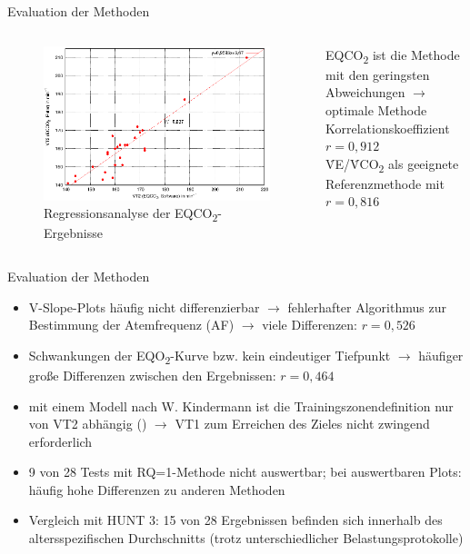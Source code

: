 \documentclass[colorBG,slideColor,8pt]{beamer}
\newcommand{\eqotwo}{EQO\textsubscript{2}}
\newcommand{\eqcotwo}{EQCO\textsubscript{2}}
\newcommand{\vcotwo}{\.{V}CO\textsubscript{2}}
\newcommand{\ve}{\.{V}E}
\begin{document}
\begin{frame}{Evaluation der Methoden}
\begin{columns}
\begin{column}{0.5\linewidth}
\begin{figure}[H]
	\centering
	\includegraphics[width=\linewidth]{Bilder/korr_eqco2.eps}
	\caption{Regressionsanalyse der \eqcotwo-Ergebnisse}
\end{figure}
\end{column}
\begin{column}{0.5\linewidth}
	\eqcotwo{} ist die Methode mit den geringsten Abweichungen $\rightarrow$ optimale Methode\\
	\vspace{3ex}
	Korrelationskoeffizient $r = 0,912$\\
	\vspace{3ex}
	\ve/\vcotwo{} als geeignete Referenzmethode mit $r = 0,816$
\end{column}
\end{columns}
\end{frame}

\begin{frame}{Evaluation der Methoden}
\begin{itemize}
	\item V-Slope-Plots häufig nicht differenzierbar $\rightarrow$ fehlerhafter Algorithmus zur Bestimmung der Atemfrequenz (AF) $\rightarrow$ viele Differenzen: $r = 0,526$
	\item Schwankungen der \eqotwo-Kurve bzw. kein eindeutiger Tiefpunkt $\rightarrow$ häufiger große Differenzen zwischen den Ergebnissen: $r = 0,464$
	\item mit einem Modell nach W. Kindermann ist die Trainingszonendefinition nur von VT2 abhängig (\cite{Kindermann.2004}) $\rightarrow$ VT1 zum Erreichen des Zieles nicht zwingend erforderlich
	\item 9 von 28 Tests mit RQ=1-Methode nicht auswertbar; bei auswertbaren Plots: häufig hohe Differenzen zu anderen Methoden
	\item Vergleich mit HUNT 3: 15 von 28 Ergebnissen befinden sich innerhalb des altersspezifischen Durchschnitts (trotz unterschiedlicher Belastungsprotokolle)
\end{itemize}
\end{frame}
\end{document}
